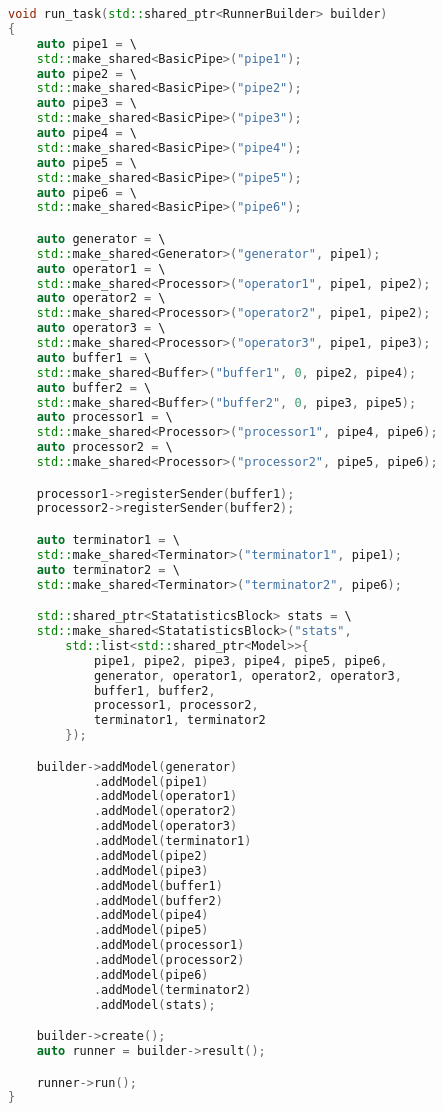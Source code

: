 \begin{lstlisting}[caption={Сборка схемы}, language=c++]
void run_task(std::shared_ptr<RunnerBuilder> builder)
{
    auto pipe1 = \
    std::make_shared<BasicPipe>("pipe1");
    auto pipe2 = \
    std::make_shared<BasicPipe>("pipe2");
    auto pipe3 = \
    std::make_shared<BasicPipe>("pipe3");
    auto pipe4 = \
    std::make_shared<BasicPipe>("pipe4");
    auto pipe5 = \
    std::make_shared<BasicPipe>("pipe5");
    auto pipe6 = \
    std::make_shared<BasicPipe>("pipe6");

    auto generator = \
    std::make_shared<Generator>("generator", pipe1);
    auto operator1 = \
    std::make_shared<Processor>("operator1", pipe1, pipe2);
    auto operator2 = \
    std::make_shared<Processor>("operator2", pipe1, pipe2);
    auto operator3 = \
    std::make_shared<Processor>("operator3", pipe1, pipe3);
    auto buffer1 = \
    std::make_shared<Buffer>("buffer1", 0, pipe2, pipe4);
    auto buffer2 = \
    std::make_shared<Buffer>("buffer2", 0, pipe3, pipe5);
    auto processor1 = \
    std::make_shared<Processor>("processor1", pipe4, pipe6);
    auto processor2 = \
    std::make_shared<Processor>("processor2", pipe5, pipe6);

    processor1->registerSender(buffer1);
    processor2->registerSender(buffer2);

    auto terminator1 = \
    std::make_shared<Terminator>("terminator1", pipe1);
    auto terminator2 = \
    std::make_shared<Terminator>("terminator2", pipe6);

    std::shared_ptr<StatatisticsBlock> stats = \
    std::make_shared<StatatisticsBlock>("stats",
        std::list<std::shared_ptr<Model>>{
            pipe1, pipe2, pipe3, pipe4, pipe5, pipe6,
            generator, operator1, operator2, operator3,
            buffer1, buffer2,
            processor1, processor2,
            terminator1, terminator2
        });

    builder->addModel(generator)
            .addModel(pipe1)
            .addModel(operator1)
            .addModel(operator2)
            .addModel(operator3)
            .addModel(terminator1)
            .addModel(pipe2)
            .addModel(pipe3)
            .addModel(buffer1)
            .addModel(buffer2)
            .addModel(pipe4)
            .addModel(pipe5)
            .addModel(processor1)
            .addModel(processor2)
            .addModel(pipe6)
            .addModel(terminator2)
            .addModel(stats);

    builder->create();
    auto runner = builder->result();

    runner->run();
}
\end{lstlisting}


